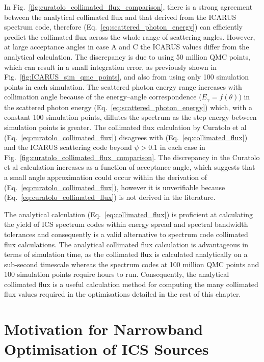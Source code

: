 \documentclass[../main.tex]{subfiles}
\begin{document}
In Fig.~\ref{fig:curatolo_collimated_flux_comparison}, there is a strong agreement between the analytical collimated flux and that derived from the \textsc{ICARUS} spectrum code, therefore (Eq.~\ref{eq:scattered_photon_energy}) can efficiently predict the collimated flux across the whole range of scattering angles. However, at large acceptance angles in case A and C the \textsc{ICARUS} values differ from the analytical calculation. The discrepancy is due to using 50 million QMC points, which can result in a small integration error, as previously shown in Fig.~\ref{fig:ICARUS_sim_qmc_points}, and also from using only 100 simulation points in each simulation. The scattered photon energy range increases with collimation angle because of the energy--angle correspondence ($E_{\gamma}=f\left(\theta\right)$) in the scattered photon energy (Eq.~\ref{eq:scattered_photon_energy}) which, with a constant 100 simulation points, dillutes the spectrum as the step energy between simulation points is greater. The collimated flux calculation by Curatolo et al \cite{curatolo2017analytical} (Eq.~\ref{eq:curatolo_collimated_flux}) disagrees with (Eq.~\ref{eq:collimated_flux}) and the \textsc{ICARUS} scattering code beyond $\psi>0.1$ in each case in Fig.~\ref{fig:curatolo_collimated_flux_comparison}. The discrepancy in the Curatolo et al calculation increases as a function of acceptance angle, which suggests that a small angle approximation could occur within the derivation of (Eq.~\ref{eq:curatolo_collimated_flux}), however it is unverifiable because (Eq.~\ref{eq:curatolo_collimated_flux}) is not derived in the literature.  

The analytical calculation (Eq.~\ref{eq:collimated_flux}) is proficient at calculating the yield of ICS spectrum codes within energy spread and spectral bandwidth tolerances and consequently is a valid alternative to spectrum code collimated flux calculations. The analytical collimated flux calculation is advantageous in terms of simulation time, as the collimated flux is calculated analytically on a sub-second timescale whereas the spectrum codes at 100 million QMC points and 100 simulation points require hours to run. Consequently, the analytical collimated flux is a useful calculation method for computing the many collimated flux values required in the optimisations detailed in the rest of this chapter.   

\section{Motivation for Narrowband Optimisation of ICS Sources}
\label{sec:motivation_optimisation}
\end{document}
